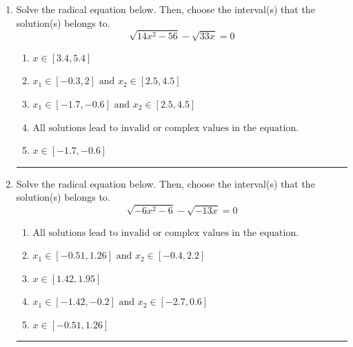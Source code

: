 \documentclass[14pt]{extbook}
\newcommand{\litem}[1]{\item#1\hspace*{-1cm}\rule{\textwidth}{0.4pt}}
\begin{document}
\begin{enumerate}
\litem{
Solve the radical equation below. Then, choose the interval(s) that the solution(s) belongs to.\[ \sqrt{14 x^2 - 56} - \sqrt{33 x} = 0 \]\begin{enumerate}[label=\Alph*.]
\item \( x \in [3.4,5.4] \)
\item \( x_1 \in [-0.3, 2] \text{ and } x_2 \in [2.5,4.5] \)
\item \( x_1 \in [-1.7, -0.6] \text{ and } x_2 \in [2.5,4.5] \)
\item \( \text{All solutions lead to invalid or complex values in the equation.} \)
\item \( x \in [-1.7,-0.6] \)

\end{enumerate} }
\litem{
Solve the radical equation below. Then, choose the interval(s) that the solution(s) belongs to.\[ \sqrt{-6 x^2 - 6} - \sqrt{-13 x} = 0 \]\begin{enumerate}[label=\Alph*.]
\item \( \text{All solutions lead to invalid or complex values in the equation.} \)
\item \( x_1 \in [-0.51, 1.26] \text{ and } x_2 \in [-0.4,2.2] \)
\item \( x \in [1.42,1.95] \)
\item \( x_1 \in [-1.42, -0.2] \text{ and } x_2 \in [-2.7,0.6] \)
\item \( x \in [-0.51,1.26] \)


\end{enumerate}}
\end{enumerate}
\end{document}
